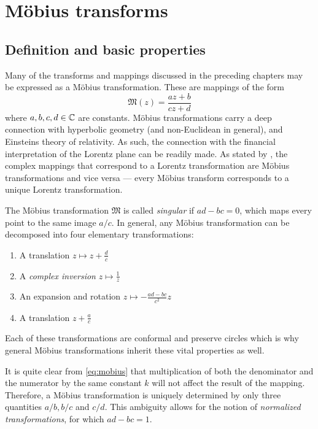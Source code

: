 \chapter{Möbius transforms}
\label{chap:moebius_transforms}

\section{Definition and basic properties}
Many of the transforms and mappings discussed in the preceding chapters may be expressed as a Möbius transformation. These are mappings of the form \cite{Needham1997}
\begin{equation}
    \mathfrak{M}(z) = \frac{az + b}{cz + d}
    \label{eq:mobius}
\end{equation}
where \(a, b, c, d \in \mathbb{C} \) are constants. Möbius transformations carry a deep connection with hyperbolic geometry (and non-Euclidean in general), and Einsteins theory of relativity. As such, the connection with the financial interpretation of the Lorentz plane can be readily made. As stated by \citet{Needham1997}, the complex mappings that correspond to a Lorentz transformation are Möbius transformations and vice versa --- every Möbius transform corresponds to a unique Lorentz transformation.

The Möbius transformation \(\mathfrak{M}\) is called \emph{singular} if \(ad - bc = 0\), which maps every point to the same image \(a/c\). In general, any Möbius transformation can be decomposed into four elementary transformations:
\begin{enumerate}
    \item A translation \(z \mapsto z + \frac{d}{c}\)
    \item A \emph{complex inversion} \(z \mapsto \frac{1}{z}\)
    \item An expansion and rotation \(z \mapsto -\frac{ad - bc}{c^2}z\)
    \item A translation \(z + \frac{a}{c}\)
\end{enumerate}
Each of these transformations are conformal and preserve circles which is why general Möbius transformations inherit these vital properties as well. 

It is quite clear from \cref{eq:mobius} that multiplication of both the denominator and the numerator by the same constant \(k\) will not affect the result of the mapping. Therefore, a Möbius transformation is uniquely determined by only three quantities \(a/b, b/c\) and \(c/d\). This ambiguity allows for the notion of \emph{normalized transformations}, for which \(ad - bc = 1\). 

